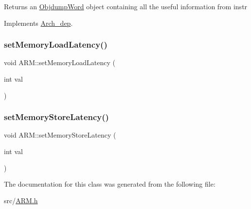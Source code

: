 Returns an \hyperlink{classObjdumpWord}{Objdump\+Word} object containing all the useful information from instr 

Implements \hyperlink{classArch__dep_a9e6075dd5bc43a1522aa65f2d11dad06}{Arch\+\_\+dep}.

\mbox{\label{classARM_af9a9f3ab8e708795e6721af9de0f956e}} 
\subsubsection{\texorpdfstring{set\+Memory\+Load\+Latency()}{setMemoryLoadLatency()}}
{\footnotesize\ttfamily void A\+R\+M\+::set\+Memory\+Load\+Latency (\begin{DoxyParamCaption}\item[{int}]{val }\end{DoxyParamCaption})}

\mbox{\label{classARM_ab7fdb3a96c6a785bd70a0b035a88b612}} 
\subsubsection{\texorpdfstring{set\+Memory\+Store\+Latency()}{setMemoryStoreLatency()}}
{\footnotesize\ttfamily void A\+R\+M\+::set\+Memory\+Store\+Latency (\begin{DoxyParamCaption}\item[{int}]{val }\end{DoxyParamCaption})}



The documentation for this class was generated from the following file\+:\begin{DoxyCompactItemize}
\item 
src/\hyperlink{ARM_8h}{A\+R\+M.\+h}\end{DoxyCompactItemize}
